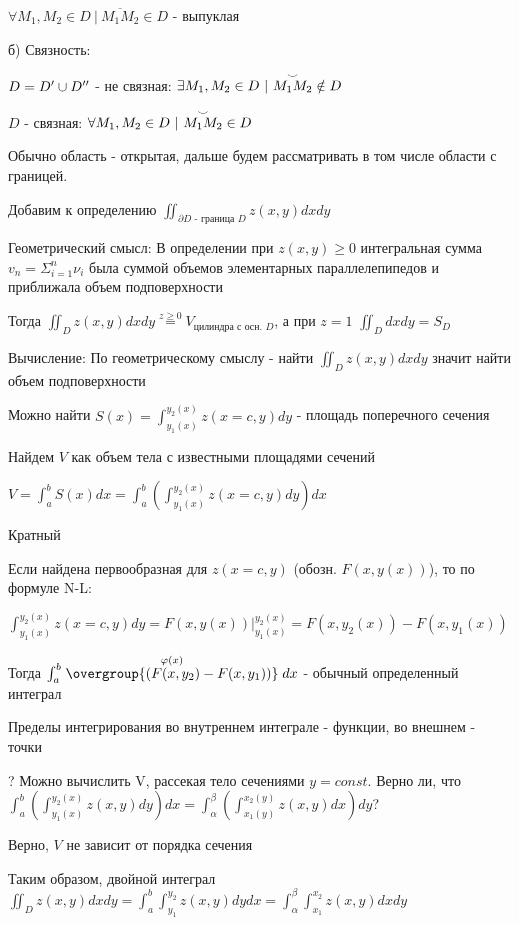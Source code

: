 \documentclass[12pt]{article}
\begin{document}
    $\forall M_1, M_2 \in D \ | \ \overline{M_1 M_2} \in D$ - выпуклая

    б) Связность:

    $D = D^\prime \cup D^{\prime\prime}$ - не связная: $\exists M_1, M_2 \in D \ | \ \overset{\LARGE\smile}{M_1 M_2} \notin D$

    $D$ - связная: $\forall M_1, M_2 \in D \ | \ \overset{\LARGE\smile}{M_1 M_2} \in D$

    Обычно область - открытая, дальше будем рассматривать в том числе области с границей.

    Добавим к определению $\iint_{\partial D \text{ - граница } D} z(x, y) dx dy$

    Геометрический смысл: В определении при $z(x, y) \geq 0$ интегральная сумма $v_n = \Sigma_{i=1}^n \nu_i$ была суммой объемов элементарных параллелепипедов и приближала объем подповерхности

    Тогда $\iint_D z(x, y) dx dy \stackrel{z \geq 0}{=} V_{\text{цилиндра с осн. } D}$, а при $z = 1$ $\iint_D dx dy = S_D$

    Вычисление: По геометрическому смыслу - найти $\iint_D z(x, y) dx dy$ значит найти объем подповерхности

    Можно найти $S(x) = \int^{y_2(x)}_{y_1(x)} z(x = c, y) dy$ - площадь поперечного сечения

    Найдем $V$ как объем тела с известными площадями сечений

    $V = \int^b_a S(x) dx = \int_a^b \left(\int^{y_2(x)}_{y_1(x)} z(x = c, y) dy\right) dx$

    \Nota Кратный

    Если найдена первообразная для $z(x = c, y)$ (обозн. $F(x, y(x))$), то по формуле N-L:

    $\int^{y_2(x)}_{y_1(x)} z(x = c, y) dy = F(x, y(x)) \Big|^{y_2(x)}_{y_1(x)} = F(x, y_2(x)) - F(x, y_1(x))$

    Тогда $\int^b_a \stackrel{\varphi(x)}{\overgroup{(F(x, y_2) - F(x, y_1))}} dx$ - обычный определенный интеграл

    Пределы интегрирования во внутреннем интеграле - функции, во внешнем - точки

    ? Можно вычислить V, рассекая тело сечениями $y = const$. Верно ли, что $\int_a^b \left(\int_{y_1(x)}^{y_2(x)} z(x, y) dy\right) dx = \int_\alpha^\beta \left(\int_{x_1(y)}^{x_2(y)} z(x, y) dx\right) dy$?

    Верно, $V$ не зависит от порядка сечения

    Таким образом, двойной интеграл $\iint_D z(x, y) dxdy = \int_a^b \int_{y_1}^{y_2} z(x, y) dydx = \int_\alpha^\beta \int_{x_1}^{x_2} z(x, y) dxdy$
\end{document}
